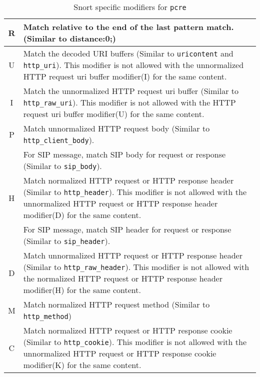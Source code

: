 \documentclass[english]{report}
\begin{document}
\begin{table}[ht]
\begin{center}
\caption{Snort specific modifiers for \texttt{pcre}}
\label{pcre-mod_snort}
\begin{tabular}{|c|p{4.5in}|}

\hline
R &
Match relative to the end of the last pattern match.  (Similar to distance:0;) \\

\hline
U &
Match the decoded URI buffers (Similar to \texttt{uricontent} and \texttt{http\_uri}).
This modifier is not allowed with the unnormalized HTTP request uri buffer modifier(I) 
for the same content. \\

\hline
I &
Match the unnormalized HTTP request uri buffer (Similar to \texttt{http\_raw\_uri}).
This modifier is not allowed with the HTTP request uri buffer modifier(U) for the
same content. \\

\hline
P &
Match unnormalized HTTP request body (Similar to \texttt{http\_client\_body}).\\

 & For SIP message, match SIP body for request or response (Similar to \texttt{sip\_body}). \\

\hline
H &
Match normalized HTTP request or HTTP response header (Similar to \texttt{http\_header}).
This modifier is not allowed with the unnormalized HTTP request or HTTP response header 
modifier(D) for the same content. \\
 & For SIP message, match SIP header for request or response (Similar to \texttt{sip\_header}). \\

\hline
D &
Match unnormalized HTTP request or HTTP response header (Similar to \texttt{http\_raw\_header}). 
This modifier is not allowed with the normalized HTTP request or HTTP response header 
modifier(H) for the same content. \\

\hline
M &
Match normalized HTTP request method (Similar to \texttt{http\_method}) \\

\hline
C &
Match normalized HTTP request or HTTP response cookie (Similar to \texttt{http\_cookie}).
This modifier is not allowed with the unnormalized HTTP request or HTTP response cookie 
modifier(K) for the same content. \\


\end{tabular}
\end{center}
\end{table}
\end{document}
